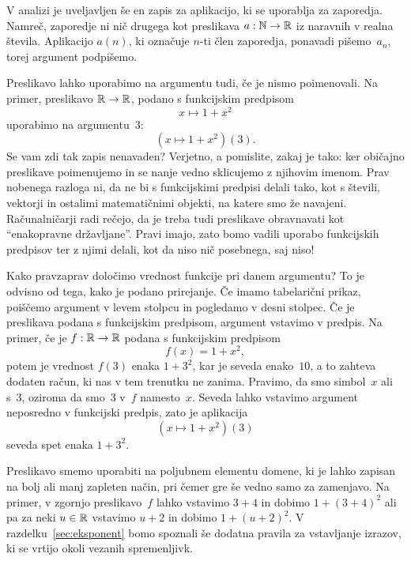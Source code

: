 V analizi je uveljavljen še en zapis za aplikacijo, ki se uporablja za zaporedja. Namreč,
zaporedje ni nič drugega kot preslikava $a : \mathbb{N} \to \mathbb{R}$ iz naravnih v realna števila.
Aplikacijo $a(n)$, ki označuje $n$-ti člen zaporedja, ponavadi pišemo~$a_n$, torej
argument podpišemo.

Preslikavo lahko uporabimo na argumentu tudi, če je nismo poimenovali. Na primer,
preslikavo $\mathbb{R} \to \mathbb{R}$, podano s funkcijskim predpisom
%
\begin{equation*}
  x \mapsto 1 + x^2
\end{equation*}
%
uporabimo na argumentu~$3$:
%
\begin{equation*}
  (x \mapsto 1 + x^2)(3).
\end{equation*}
%
Se vam zdi tak zapis nenavaden? Verjetno, a pomislite, zakaj je tako: ker običajno
preslikave poimenujemo in se nanje vedno sklicujemo z njihovim imenom. Prav nobenega
razloga ni, da ne bi s funkcijskimi predpisi delali tako, kot s števili, vektorji in
ostalimi matematičnimi objekti, na katere smo že navajeni. Računalničarji radi rečejo, da
je treba tudi preslikave obravnavati kot ``enakopravne državljane''. Pravi imajo, zato
bomo vadili uporabo funkcijskih predpisov ter z njimi delali, kot da niso nič posebnega,
saj niso!

Kako pravzaprav določimo vrednost funkcije pri danem argumentu? To je odvisno od tega,
kako je podano prirejanje. Če imamo tabelarični prikaz, poiščemo argument v levem stolpcu
in pogledamo v desni stolpec. Če je preslikava podana s funkcijskim predpisom, argument
vstavimo v predpis. Na primer, če je $f : \mathbb{R} \to \mathbb{R}$ podana s funkcijskim predpisom
%
\begin{equation*}
  f(x) = 1 + x^2,
\end{equation*}
%
potem je vrednost $f(3)$ enaka $1 + 3^2$, kar je seveda enako~$10$, a to zahteva dodaten
račun, ki nas v tem trenutku ne zanima. Pravimo, da smo simbol~$x$  ali
 s~$3$, oziroma da smo~$3$  v~$f$ namesto~$x$. Seveda lahko
vstavimo argument neposredno v funkcijski predpis, zato je aplikacija
%
\begin{equation*}
  (x \mapsto 1 + x^2)(3)
\end{equation*}
%
seveda spet enaka $1 + 3^2$.

Preslikavo smemo uporabiti na poljubnem elementu domene, ki je lahko zapisan na bolj ali
manj zapleten način, pri čemer gre še vedno samo za zamenjavo. Na primer, v zgornjo
preslikavo~$f$ lahko vstavimo $3 + 4$ in dobimo $1 + (3 + 4)^2$ ali pa za neki $u \in \mathbb{R}$
vstavimo $u + 2$ in dobimo $1 + (u + 2)^2$. V razdelku~\ref{sec:eksponent} bomo spoznali
še dodatna pravila za vstavljanje izrazov, ki se vrtijo okoli vezanih spremenljivk.


